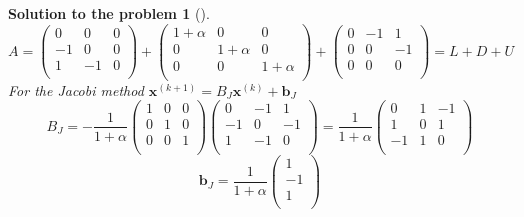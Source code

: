 \documentclass[12pt,a4]{article}
\newtheorem{solution}{Solution to the problem}
\newcommand{\bb}{{\mathbf b}}
\newcommand{\bx}{{\mathbf x}}
\begin{document}
\begin{solution}[] \rm
\[
A =
\begin{pmatrix}
0 & 0 & 0\\
-1 & 0 & 0\\
1 & -1 & 0\\
\end{pmatrix}
+
\begin{pmatrix}
1+\alpha & 0 & 0\\
0 & 1+\alpha & 0\\
0 & 0 & 1+\alpha\\
\end{pmatrix}
+
\begin{pmatrix}
0 & -1 & 1\\
0 & 0 & -1\\
0 & 0 & 0\\
\end{pmatrix}
= L + D + U
\]
For the Jacobi method $\bx^{(k+1)}=B_J\bx^{(k)}+\bb_J$
\[
B_J = - \frac1{1+\alpha}
\begin{pmatrix}
1 & 0 & 0\\
0 & 1 & 0\\
0 & 0 & 1\\
\end{pmatrix}
\begin{pmatrix}
0 & -1 & 1\\
-1 & 0 & -1\\
1 & -1 & 0\\
\end{pmatrix}
= \frac1{1+\alpha}
\begin{pmatrix}
0 & 1 & -1\\
1 & 0 & 1\\
-1 & 1 & 0\\
\end{pmatrix}
\]
\[
\bb_J = \frac1{1+\alpha} \begin{pmatrix} 1 \\ -1\\ 1 \\ \end{pmatrix}
\]
\end{solution}
\end{document}
